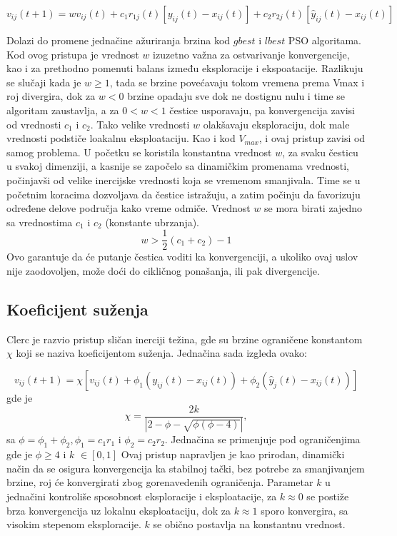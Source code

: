 \documentclass[a4paper]{article}
\begin{document}
\[v_{ij}(t+1) = wv_{ij}(t) + c_1r_{1j}(t)[y_{ij}(t) - x_{ij}(t)] + c_2r_{2j}(t)[\hat{y}_{ij}(t) - x_{ij}(t)] \]

Dolazi do promene jednačine ažuriranja brzina kod $gbest$ i $lbest$ PSO algoritama.
Kod ovog pristupa je vrednost $w$ izuzetno važna za ostvarivanje konvergencije, kao i za prethodno pomenuti balans između eksploracije i ekspoatacije. Razlikuju se slučaji kada je $w \geq 1$, tada se brzine povećavaju tokom vremena prema Vmax i roj divergira, dok za $w < 0$ brzine opadaju sve dok ne dostignu nulu i time se algoritam zaustavlja, a za $0 < w < 1$ čestice usporavaju, pa konvergencija zavisi od vrednosti $c_1$ i $c_2$. Tako velike vrednosti  $w$ olakšavaju eksploraciju, dok male vrednosti podstiče loakalnu eksploataciju. 
Kao i kod $V_{max}$, i ovaj pristup zavisi od samog problema. U početku se koristila konstantna vrednost $w$, za svaku česticu u svakoj dimenziji, a kasnije se započelo sa dinamičkim promenama vrednosti, počinjavši od velike inercijske vrednosti koja se vremenom smanjivala. Time se u početnim koracima dozvoljava da čestice istražuju, a zatim počinju da favorizuju određene delove područja kako vreme odmiče.
Vrednost $w$ se mora birati zajedno sa vrednostima $c_1$ i $c_2$ (konstante ubrzanja). $$w > \frac{1}{2}(c_1 + c_2) - 1$$ Ovo garantuje da će putanje čestica voditi ka konvergenciji, a ukoliko ovaj uslov nije zaodovoljen, može doći do cikličnog ponašanja, ili pak divergencije.

\subsection{Koeficijent suženja}
Clerc je razvio pristup sličan inerciji težina, gde su brzine ograničene konstantom $\chi$ koji se naziva koeficijentom suženja. Jednačina sada izgleda ovako:

\[v_{ij} (t + 1) = \chi[v_{ij} (t) + \phi_1 (y_{ij} (t) - x_{ij} (t)) + \phi_2 (\hat{y}_j (t) - x_{ij} (t))]\]
gde je $$\chi = \frac{2k}{|2-\phi-\sqrt{\phi(\phi-4)}|},$$sa $\phi = \phi_1 +  \phi_2 , \phi_1 = c_1r_1$ i $\phi_2 = c_2r_2$.
Jednačina se primenjuje pod ograničenjima gde je $\phi \geq 4$ i $k$ $\in [0, 1]$
Ovaj pristup napravljen je kao prirodan, dinamički način da se osigura konvergencija ka stabilnoj tački, bez potrebe za smanjivanjem brzine, roj će konvergirati zbog gorenavedenih ograničenja.
Parametar $k$ u jednačini kontroliše sposobnost eksploracije i eksploatacije, za $k \approx 0$ se postiže brza konvergencija uz lokalnu eksploataciju, dok za  $k \approx 1$ sporo konvergira, sa visokim stepenom eksploracije. $k$ se obično postavlja na konstantnu vrednost.
\end{document}
